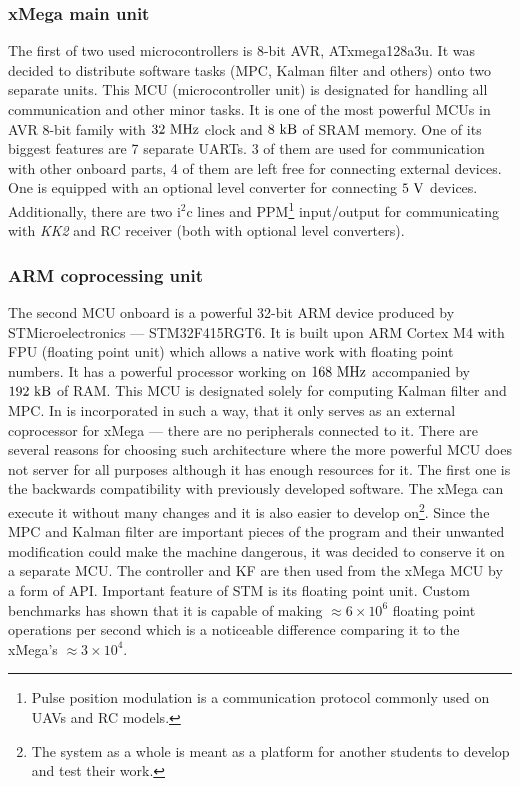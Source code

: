 \subsubsection{xMega main unit}

The first of two used microcontrollers is 8-bit AVR, ATxmega128a3u. It was decided to distribute software tasks (MPC, Kalman filter and others) onto two separate units. This MCU (microcontroller unit) is designated for handling all communication and other minor tasks. It is one of the most powerful MCUs in AVR 8-bit family with $32 ~\mathrm{MHz}$ clock and $8 ~\mathrm{kB}$ of SRAM memory. One of its biggest features are 7 separate UARTs. 3 of them are used for communication with other onboard parts, 4 of them are left free for connecting external devices. One is equipped with an optional level converter for connecting $5 ~\mathrm{V}$ devices. Additionally, there are two $\mathrm{i}^2\mathrm{c}$ lines and PPM\footnote{Pulse position modulation is a communication protocol commonly used on UAVs and RC models.} input/output for communicating with \textit{KK2} and RC receiver (both with optional level converters).

\subsubsection{ARM coprocessing unit}

The second MCU onboard is a powerful 32-bit ARM device produced by STMicroelectronics --- STM32F415RGT6. It is built upon ARM Cortex M4 with FPU (floating point unit) which allows a native work with floating point numbers. It has a powerful processor working on $168 ~\mathrm{MHz}$ accompanied by $192 ~\mathrm{kB}$ of RAM. This MCU is designated solely for computing Kalman filter and MPC. In is incorporated in such a way, that it only serves as an external coprocessor for xMega --- there are no peripherals connected to it. There are several reasons for choosing such architecture where the more powerful MCU does not server for all purposes although it has enough resources for it. The first one is the backwards compatibility with previously developed software. The xMega can execute it without many changes and it is also easier to develop on\footnote{The system as a whole is meant as a platform for another students to develop and test their work.}. Since the MPC and Kalman filter are important pieces of the program and their unwanted modification could make the machine dangerous, it was decided to conserve it on a separate MCU. The controller and KF are then used from the xMega MCU by a form of API. Important feature of STM is its floating point unit. Custom benchmarks has shown that it is capable of making $\approx 6 \times 10^6$ floating point operations per second which is a noticeable  difference comparing it to the xMega's $\approx 3\times 10^4$.

